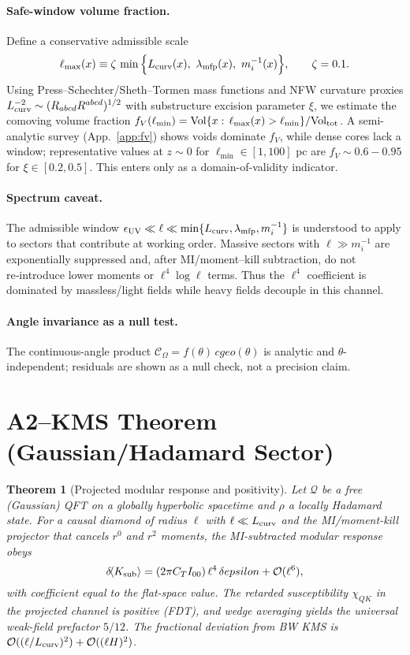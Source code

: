 \documentclass[aps,prd,onecolumn,superscriptaddress,nofootinbib]{revtex4-2}
\def\cgeo{cgeo}%
\def\eps{epsilon}%
\def\Omega_\Lambda{OmegaLambda}%
\providecommand{\cgeo}{c_{\rm geo}}
\providecommand{\eps}{\varepsilon}
\providecommand{\be}{\begin{equation}}
\providecommand{\ee}{\end{equation}}
\newtheorem{theorem}{Theorem}
\begin{document}
\paragraph{Safe-window volume fraction.} Define a conservative admissible scale
\be
\label{eq:lmax}
\ell_{\max}(x)\equiv \zeta\,\min\Big\{L_{\rm curv}(x),\ \lambda_{\rm mfp}(x),\ m_i^{-1}(x)\Big\},\qquad \zeta=0.1.
\ee
Using Press–Schechter/Sheth–Tormen mass functions and NFW curvature proxies \(L_{\rm curv}^{-2}\sim (R_{abcd}R^{abcd})^{1/2}\) with substructure excision parameter \(\xi\), we estimate the comoving volume fraction \(f_V(\ell_{\min})=\mathrm{Vol}\{x:\,\ell_{\max}(x)>\ell_{\min}\}/\mathrm{Vol}_{\rm tot}\). A semi-analytic survey (App.~\ref{app:fv}) shows voids dominate \(f_V\), while dense cores lack a window; representative values at \(z\!\sim\!0\) for \(\ell_{\min}\in[1,100]\) pc are \(f_V\sim 0.6{-}0.95\) for \(\xi\in[0.2,0.5]\). This enters only as a domain-of-validity indicator.

\paragraph{Spectrum caveat.}
The admissible window \(\epsilon_{\rm UV}\ll \ell\ll\min\{L_{\rm curv},\lambda_{\rm mfp},m_i^{-1}\}\) is understood to apply to sectors that contribute at working order. Massive sectors with \(\ell\gg m_i^{-1}\) are exponentially suppressed and, after MI/moment–kill subtraction, do not re‑introduce lower moments or \(\ell^4\log\ell\) terms. Thus the \(\ell^4\) coefficient is dominated by massless/light fields while heavy fields decouple in this channel.

\paragraph{Angle invariance as a null test.} The continuous-angle product \(\mathcal C_\Omega=f(\theta)\,\cgeo(\theta)\) is analytic and \(\theta\)-independent; residuals are shown as a null check, not a precision claim.

\section{A2–KMS Theorem (Gaussian/Hadamard Sector)}
\label{sec:theorem}

\begin{theorem}[Projected modular response and positivity]\label{thm:proj-modresp}
Let \(\mathcal Q\) be a free (Gaussian) QFT on a globally hyperbolic spacetime and \(\rho\) a locally Hadamard state. For a causal diamond of radius \(\ell\) with \(\ell\ll L_{\rm curv}\) and the MI/moment-kill projector that cancels \(r^0\) and \(r^2\) moments, the MI-subtracted modular response obeys
\be
\delta\!\langle K_{\rm sub}\rangle=(2\pi C_T I_{00})\,\ell^4\,\delta\eps+\mathcal O(\ell^6),
\ee
with coefficient equal to the flat-space value. The retarded susceptibility \(\chi_{QK}\) in the projected channel is positive (FDT), and wedge averaging yields the universal weak-field prefactor \(5/12\). The fractional deviation from BW KMS is \(\mathcal O((\ell/L_{\rm curv})^2)+\mathcal O((\ell H)^2)\).
\end{theorem}
\end{document}
